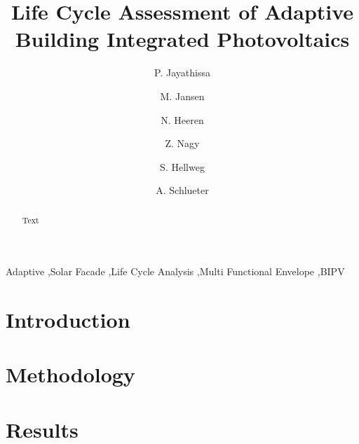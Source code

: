 \documentclass[preprint,12pt]{elsarticle} %
\begin{document}
\begin{frontmatter}

\title{Life Cycle Assessment of Adaptive Building Integrated Photovoltaics} 


\author[ita]{P. Jayathissa }

\author[ita]{M. Jansen}

\author[baug]{N. Heeren}

\author[ita]{Z. Nagy}

\author[baug]{S. Hellweg}


\author[ita]{A. Schlueter  }



\address[ita]{Architecture and Building Systems, Institute of Technology in Architecture, Department of Architecture,\\ ETH Zurich, Switzerland} 
\address[baug]{Ecological System Design, Institute of Environmental Engineering,\\ ETH Zurich, Switzerland}

\begin{abstract}
Text 
\end{abstract}

\begin{keyword}
Adaptive \sep Solar Facade \sep Life Cycle Analysis \sep Multi Functional Envelope \sep BIPV
\end{keyword}

\end{frontmatter}

\section{Introduction}
\label{ch:introduction}


\section{Methodology}
\label{ch:method}


\section{Results}
\label{ch:results}


\end{document}
